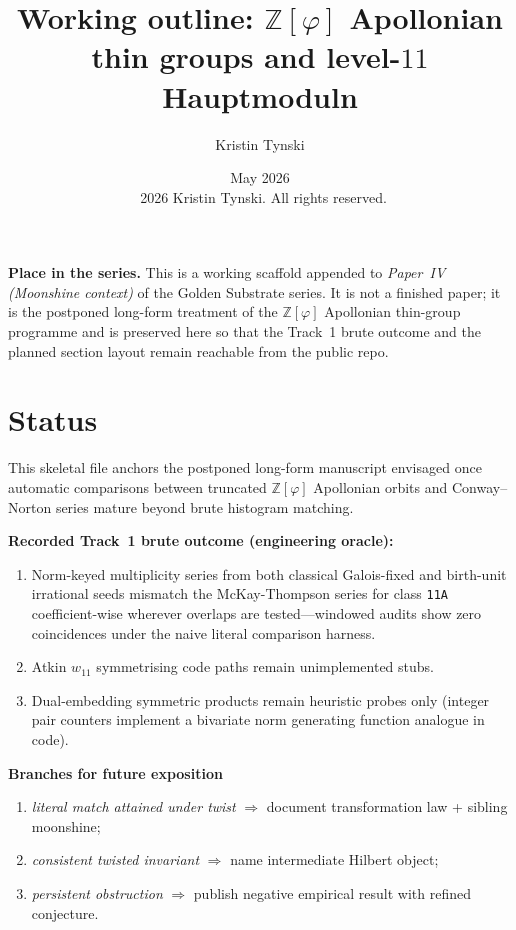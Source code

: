 \documentclass[11pt,a4paper]{article}
\title{Working outline: $\mathbb{Z}[\varphi]$ Apollonian thin groups and level-$11$ Hauptmoduln}
\author{Kristin Tynski}
\date{May 2026 \\[6pt] {\small\textcopyright\ 2026 Kristin Tynski. All rights reserved.}}
\theoremstyle{plain}
\theoremstyle{definition}
\theoremstyle{remark}
\numberwithin{equation}{section}
\begin{document}
\maketitle

\noindent\textbf{Place in the series.}
This is a working scaffold appended to \emph{Paper~IV (Moonshine
context)} of the Golden Substrate series.  It is not a finished
paper; it is the postponed long-form treatment of the
$\mathbb{Z}[\varphi]$ Apollonian thin-group programme and is
preserved here so that the Track~1 brute outcome and the planned
section layout remain reachable from the public repo.

\section*{Status}

This skeletal file anchors the postponed long-form manuscript envisaged once
automatic comparisons between truncated $\mathbb{Z}[\varphi]$ Apollonian
orbits and Conway--Norton series mature beyond brute histogram matching.

\textbf{Recorded Track~1 brute outcome (engineering oracle):}

\begin{enumerate}
\item Norm-keyed multiplicity series from both classical Galois-fixed and
birth-unit irrational seeds mismatch the McKay-Thompson series for class \texttt{11A}
coefficient-wise wherever overlaps are tested---windowed audits show zero coincidences
under the naive literal comparison harness.
\item Atkin $w_{11}$ symmetrising code paths remain unimplemented stubs.
\item Dual-embedding symmetric products remain heuristic probes only (integer pair counters
implement a bivariate norm generating function analogue in code).
\end{enumerate}

\textbf{Branches for future exposition}

\begin{enumerate}
\item \textit{literal match attained under twist} \(\Rightarrow\) document transformation law + sibling moonshine;
\item \textit{consistent twisted invariant} \(\Rightarrow\) name intermediate Hilbert object;
\item \textit{persistent obstruction} \(\Rightarrow\) publish negative empirical result with refined conjecture.
\end{enumerate}
\end{document}
